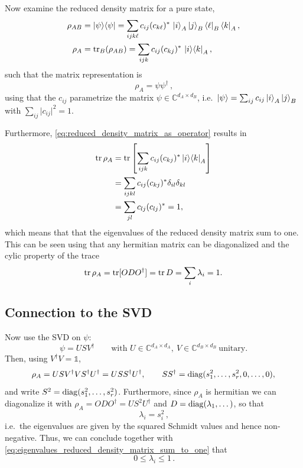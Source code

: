 \documentclass[../../main.tex]{subfiles}
\begin{document}
Now examine the reduced density matrix for a pure state,
\begin{align}
\rho_{AB}&=\left\lvert \psi \right\rangle\!\left\langle \psi \right\rvert
=\sum_{ijk\ell}c_{ij}(c_{k\ell})^*\,\left\lvert i \right\rangle_A\left\lvert j \right\rangle_B\left\langle \ell \right\rvert_B\left\langle k \right\rvert_A,\\
\rho_A&=\operatorname{tr}_B(\rho_{AB})=\sum_{ijk}c_{ij}(c_{kj})^*\,\left\lvert i \right\rangle\!\left\langle k \right\rvert_A, \label{eq:reduced_density_matrix_as_operator}
\end{align}
such that the matrix representation is
\begin{equation}
\boxed{\,\rho_A=\psi\psi^\dagger\,}, \label{eq:density_matrix_as_wavefunction_coefficients}
\end{equation}
using that the $c_{ij}$ parametrize the matrix $\psi\in\mathbb C^{d_A\times d_B}$, i.e.\
$\left\lvert \psi \right\rangle=\sum_{ij}c_{ij}\left\lvert i \right\rangle_A\left\lvert j \right\rangle_B$ with $\sum_{ij} \vert c_{ij} \vert^2 = 1$.


Furthermore, \cref{eq:reduced_density_matrix_as_operator} results in
\begin{align}
      \operatorname{tr} \rho_A &= \operatorname{tr} \left[ \sum_{ijk} c_{ij} (c_{kj})^* \left\lvert i \right\rangle\!\left\langle k \right\rvert_A \right] \notag \\
      &= \sum_{ijkl} c_{ij} (c_{kj})^* \delta_{il} \delta_{kl} \notag \\
      &= \sum_{jl} c_{lj} (c_{lj})^* = 1 , \notag
\end{align}
which means that that the eigenvalues of the reduced density matrix sum to one. This can be seen using that any hermitian matrix can be diagonalized and the cylic property of the trace
\begin{equation}
      \operatorname{tr} \rho_A = \operatorname{tr} [O D O^\dagger] = \operatorname{tr} D = \sum_i \lambda_i = 1. \label{eq:eigenvalues_reduced_density_matrix_sum_to_one}
\end{equation}


\subsection{Connection to the SVD}

Now use the SVD on $\psi$:
\begin{equation}
\psi=USV^\dagger\qquad\text{with }U\in\mathbb C^{d_A\times d_A},\ V\in\mathbb C^{d_B\times d_B}\ \text{unitary.}
\end{equation}
Then, using $V^\dagger V=\mathds 1$,
\begin{equation}
\rho_A=USV^\dagger VS^\dagger U^\dagger
=USS^\dagger U^\dagger,
\qquad
SS^\dagger=\operatorname{diag}(s_1^2,\dots,s_r^2,0,\dots,0),
\end{equation}
and write $S^2 = \operatorname{diag}(s_1^2,\dots,s_r^2)$.
Furthermore, since $\rho_A$ is hermitian we can diagonalize it with
$\rho_A=ODO^\dagger=US^2 U^\dagger$ and $D=\operatorname{diag}(\lambda_1,\dots)$, so that
\begin{equation}
\boxed{\,\lambda_i=s_i^2\,},
\end{equation}
i.e.\ the eigenvalues are given by the squared Schmidt values and hence non-negative. Thus, we can conclude together with \cref{eq:eigenvalues_reduced_density_matrix_sum_to_one} that 
\begin{equation}
      \boxed{\, 0 \leq \lambda_i \leq 1 \,} . \label{eq:range_of_eigenvalues_of_reduced_density_matrix}
\end{equation}
\end{document}
